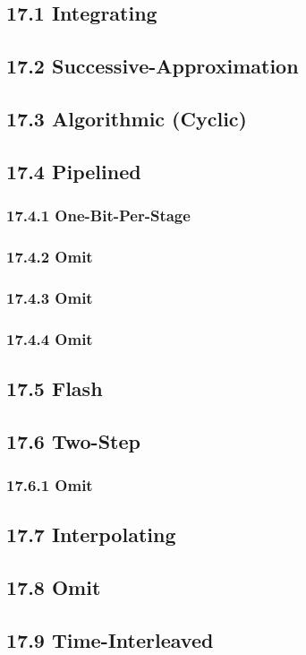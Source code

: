 \subsection{17.1 Integrating}
\subsection{17.2 Successive-Approximation}
\subsection{17.3 Algorithmic (Cyclic)}
\subsection{17.4 Pipelined}
  \subsubsection{17.4.1 One-Bit-Per-Stage}
  \subsubsection{17.4.2 Omit}
  \subsubsection{17.4.3 Omit}
  \subsubsection{17.4.4 Omit}
\subsection{17.5 Flash}
\subsection{17.6 Two-Step}
  \subsubsection{17.6.1 Omit}
\subsection{17.7 Interpolating}
\subsection{17.8 Omit}
\subsection{17.9 Time-Interleaved}
